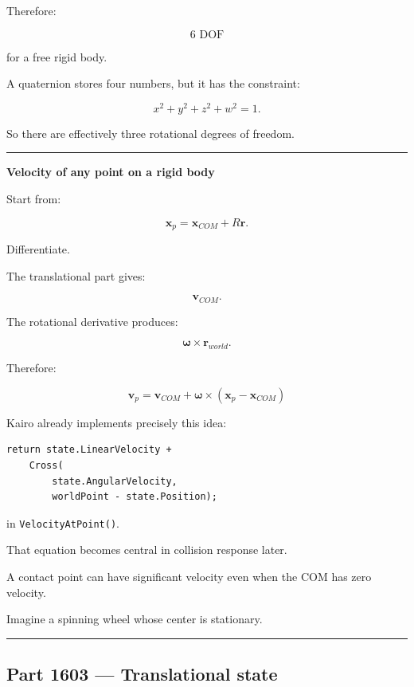 Therefore:

\[
\boxed{6\text{ DOF}}
\]

for a free rigid body.

A quaternion stores four numbers, but it has the constraint:

\[
x^2+y^2+z^2+w^2=1.
\]

So there are effectively three rotational degrees of freedom.

\begin{center}\rule{0.5\linewidth}{0.5pt}\end{center}

\textbf{Velocity of any point on a rigid body}

Start from:

\[
\mathbf{x}_p
=
\mathbf{x}_{COM}
+
R\mathbf{r}.
\]

Differentiate.

The translational part gives:

\[
\mathbf{v}_{COM}.
\]

The rotational derivative produces:

\[
\boldsymbol{\omega}\times\mathbf{r}_{world}.
\]

Therefore:

\[
\boxed{
\mathbf{v}_p
=
\mathbf{v}_{COM}
+
\boldsymbol{\omega}
\times
(\mathbf{x}_p-\mathbf{x}_{COM})
}
\]

Kairo already implements precisely this idea:

\begin{verbatim}
return state.LinearVelocity +
    Cross(
        state.AngularVelocity,
        worldPoint - state.Position);
\end{verbatim}

in \texttt{VelocityAtPoint()}.

That equation becomes central in collision response later.

A contact point can have significant velocity even when the COM has zero velocity.

Imagine a spinning wheel whose center is stationary.

\begin{center}\rule{0.5\linewidth}{0.5pt}\end{center}

\subsection{Part 1603 --- Translational state}\label{06-engine-ii-ch034-part-1603-translational-state}

